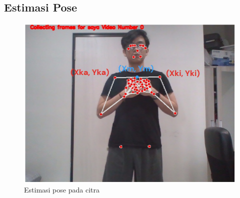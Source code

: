 \subsection{Estimasi Pose}

\begin{figure}[H]
  \centering

  \includegraphics[scale=0.6]{gambar/bab3-estimasi-pose.png}

  \caption{Estimasi pose pada citra}
  \label{fig:poseEstimationMethod}
\end{figure}

